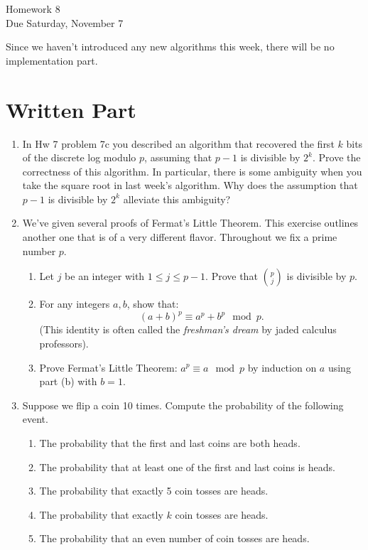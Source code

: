 \documentclass[11pt]{article}
\begin{document}
\begin{center}
\Large {Homework 8}\\
\small {Due Saturday, November 7}
\end{center}
Since we haven't introduced any new algorithms this week, there will be no implementation part.
\section*{Written Part}
\begin{enumerate}
  \item{
  In Hw 7 problem 7c you described an algorithm that recovered the first $k$ bits of the discrete log modulo $p$, assuming that $p-1$ is divisible by $2^k$.  Prove the correctness of this algorithm.  In particular, there is some ambiguity when you take the square root in last week's algorithm.  Why does the assumption that $p-1$ is divisible by $2^k$ alleviate this ambiguity?
  }
  \item{
  We've given several proofs of Fermat's Little Theorem.  This exercise outlines another one that is of a very different flavor.  Throughout we fix a prime number $p$.
  \begin{enumerate}
    \item{
    Let $j$ be an integer with $1\le j\le p-1$.  Prove that $p\choose j$ is divisible by $p$.
    }
    \item{
    For any integers $a,b$, show that:
    \[(a+b)^p\equiv a^p + b^p\mod p.\]
    (This identity is often called the \textit{freshman's dream} by jaded calculus professors).
    }
    \item{
    Prove Fermat's Little Theorem: $a^p\equiv a\mod p$ by induction on $a$ using part (b) with $b=1$.
    }
  \end{enumerate}
  }
  \item{
  Suppose we flip a coin 10 times.  Compute the probability of the following event.
  \begin{enumerate}
    \item{
    The probability that the first and last coins are both heads.
    }
    \item{
    The probability that at least one of the first and last coins is heads.
    }
    \item{
    The probability that exactly 5 coin tosses are heads.
    }
    \item{
    The probability that exactly $k$ coin tosses are heads.
    }
    \item{
    The probability that an even number of coin tosses are heads.
}
\end{enumerate}}
\end{enumerate}
\end{document}
